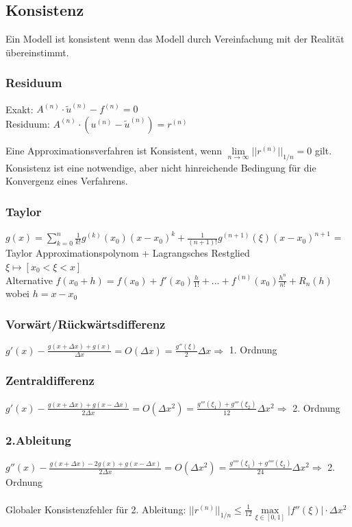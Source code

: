 \subsection{Konsistenz}
Ein Modell ist konsistent wenn das Modell durch Vereinfachung mit der Realität übereinstimmt.

\subsubsection{Residuum}
Exakt: $A^{(n)}\cdot \tilde{u}^{(n)}-f^{(n)}=0$\\
Residuum: $A^{(n)}\cdot (u^{(n)}-\tilde{u}^{(n)})=r^{(n)}$

Eine Approximationsverfahren ist Konsistent, wenn $\boxed{\lim\limits_{n\rightarrow \infty}||r^{(n)}||_{1/n}=0}$ gilt.\\

Konsistenz ist eine notwendige, aber nicht hinreichende Bedingung für die Konvergenz eines Verfahrens.

\subsubsection{Taylor}
$g(x)= \sum\limits_{k=0}^n\frac{1}{k!} g^{(k)}(x_0)(x-x_0)^k +
\frac{1}{(n+1)!}g^{(n+1)}(\xi)(x-x_0)^{n+1}$ = Taylor
Approximationspolynom  + Lagrangsches Restglied\\
$\xi \longmapsto [x_0 < \xi < x]$\\

Alternative
$ f(x_0+h)=f(x_0)+f'(x_0)\frac{h}{1!}+...+f^{(n)}(x_0)\frac{h^n}{n!}+R_n(h) $ wobei $ h = x - x_0 $




\subsubsection{Vorwärt/Rückwärtsdifferenz}
$g'(x) - \frac{g(x+\Delta x) + g(x)}{\Delta x}= O(\Delta x) =
\frac{g''(\xi)}{2}\Delta x \Rightarrow$  1. Ordnung


\subsubsection{Zentraldifferenz}
$g'(x) - \frac{g(x+\Delta x) + g(x-\Delta x)}{2\Delta x}= O(\Delta x^2) =
\frac{g'''(\xi_1) + g'''(\xi_2)}{12}\Delta x^2 \Rightarrow$ 2. Ordnung



\subsubsection{2.Ableitung}
$g''(x) - \frac{g(x+\Delta x) -2 g(x)+ g(x-\Delta x)}{2\Delta x}= O(\Delta x^2) =
\frac{g''''(\xi_1) + g''''(\xi_2)}{24}\Delta x^2 \Rightarrow$ 2. Ordnung\\
\\
Globaler Konsistenzfehler für 2. Ableitung: $||r^{(n)}||_{1/n}\leq \frac 1{12}\max\limits_{\xi\in[0,1]}|f''(\xi)|\cdot \Delta x^2$

